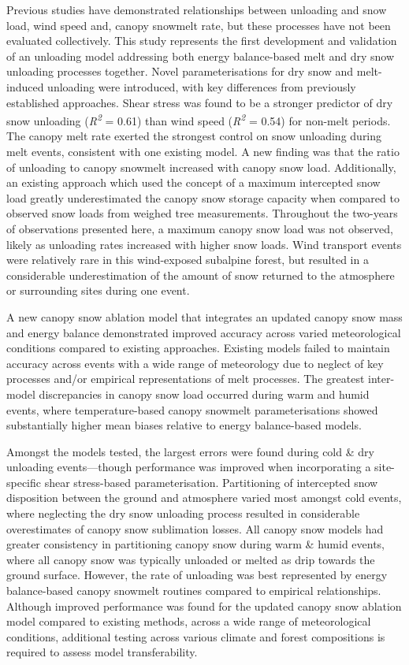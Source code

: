 \documentclass[
]{agujournal2019}
\begin{document}
Previous studies have demonstrated relationships between unloading and
snow load, wind speed and, canopy snowmelt rate, but these processes
have not been evaluated collectively. This study represents the first
development and validation of an unloading model addressing both energy
balance-based melt and dry snow unloading processes together. Novel
parameterisations for dry snow and melt-induced unloading were
introduced, with key differences from previously established approaches.
Shear stress was found to be a stronger predictor of dry snow unloading
(\emph{R\textsuperscript{2}} = 0.61) than wind speed
(\emph{R\textsuperscript{2}} = 0.54) for non-melt periods. The canopy
melt rate exerted the strongest control on snow unloading during melt
events, consistent with one existing model. A new finding was that the
ratio of unloading to canopy snowmelt increased with canopy snow load.
Additionally, an existing approach which used the concept of a maximum
intercepted snow load greatly underestimated the canopy snow storage
capacity when compared to observed snow loads from weighed tree
measurements. Throughout the two-years of observations presented here, a
maximum canopy snow load was not observed, likely as unloading rates
increased with higher snow loads. Wind transport events were relatively
rare in this wind-exposed subalpine forest, but resulted in a
considerable underestimation of the amount of snow returned to the
atmosphere or surrounding sites during one event.

A new canopy snow ablation model that integrates an updated canopy snow
mass and energy balance demonstrated improved accuracy across varied
meteorological conditions compared to existing approaches. Existing
models failed to maintain accuracy across events with a wide range of
meteorology due to neglect of key processes and/or empirical
representations of melt processes. The greatest inter-model
discrepancies in canopy snow load occurred during warm and humid events,
where temperature-based canopy snowmelt parameterisations showed
substantially higher mean biases relative to energy balance-based
models.

Amongst the models tested, the largest errors were found during cold \&
dry unloading events---though performance was improved when
incorporating a site-specific shear stress-based parameterisation.
Partitioning of intercepted snow disposition between the ground and
atmosphere varied most amongst cold events, where neglecting the dry
snow unloading process resulted in considerable overestimates of canopy
snow sublimation losses. All canopy snow models had greater consistency
in partitioning canopy snow during warm \& humid events, where all
canopy snow was typically unloaded or melted as drip towards the ground
surface. However, the rate of unloading was best represented by energy
balance-based canopy snowmelt routines compared to empirical
relationships. Although improved performance was found for the updated
canopy snow ablation model compared to existing methods, across a wide
range of meteorological conditions, additional testing across various
climate and forest compositions is required to assess model
transferability.
\end{document}
